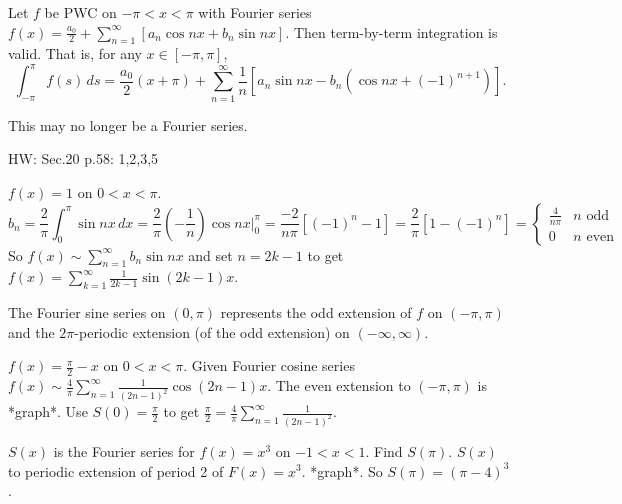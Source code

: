 \documentclass[]{article}
\begin{document}

\begin{theorem}
	Let $f$ be PWC on $-\pi<x<\pi$ with Fourier series $f(x) = \frac{a_0}{2} + \sum_{n=1}^\infty [ a_n\cos{nx} + b_n\sin{nx}]$. Then term-by-term integration is valid. That is, for any $x\in[-\pi,\pi]$, $$\int_{-\pi}^\pi f(s) \, ds = \frac{a_0}{2}(x+\pi) + \sum_{n=1}^\infty \frac{1}{n}\left[ a_n\sin{nx} - b_n\left(\cos{nx} +(-1)^{n+1} \right)\right]. $$
	\begin{note}
		This may no longer be a Fourier series.
	\end{note}
\end{theorem}
HW: Sec.20 p.58: 1,2,3,5
\begin{example}
	$f(x) = 1$ on $0<x<\pi$. $$b_n = \frac{2}{\pi}\int_0^\pi\sin{nx}\, dx = \frac{2}{\pi} \left( -\frac{1}{n} \right) \cos{nx} \bigg\rvert_0^\pi = \frac{-2}{n\pi} \left[ (-1)^n-1 \right] = \frac{2}{\pi} [1-(-1)^n] = \begin{cases} \frac{4}{n\pi} & n \text{ odd} \\ 0 & n \text{ even} \end{cases}$$ So $f(x) \sim \sum_{n=1}^\infty b_n \sin{nx} $ and set $n=2k-1$ to get $f(x) = \sum_{k=1}^\infty \frac{1}{2k-1}\sin{(2k-1)x}$.
	
	The Fourier sine series on $(0,\pi)$ represents the odd extension of $f$ on $(-\pi,\pi)$ and the $2\pi$-periodic extension (of the odd extension) on $(-\infty,\infty)$.
\end{example}

\begin{example}
	 $f(x) = \frac{\pi}{2} - x$ on $0<x<\pi$. Given Fourier cosine series $f(x) \sim \frac{4}{\pi} \sum_{n=1}^\infty \frac{1}{(2n-1)^2} \cos{(2n-1)x}$. The even extension to $(-\pi,\pi)$ is *graph*.
	Use $S(0)=\frac{\pi}{2}$ to get $\frac{\pi}{2} = \frac{4}{\pi} \sum_{n=1}^\infty \frac{1}{(2n-1)^2}$.
\end{example}
\begin{example}
	 $S(x)$ is the Fourier series for $f(x) = x^3$ on $-1<x<1$. Find $S(\pi)$. $S(x)$  to periodic extension of period 2 of $F(x) = x^3$. *graph*. So $S(\pi) = (\pi-4)^3$.
\end{example}
\end{document}
